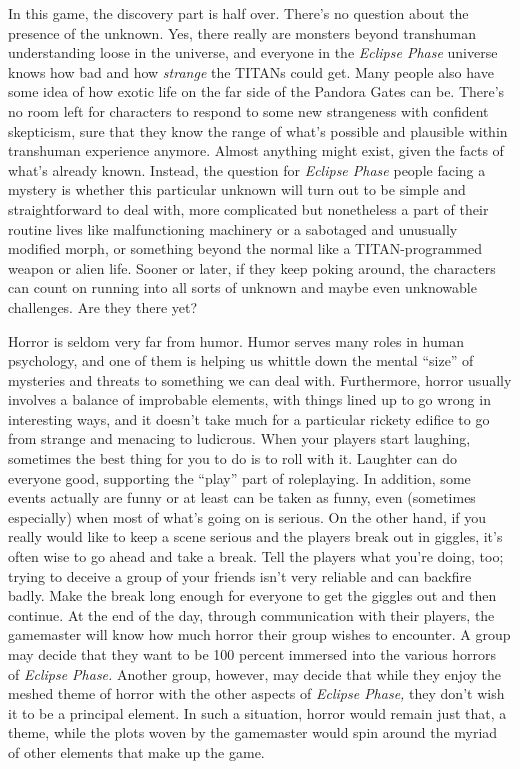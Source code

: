 In this game, the discovery part is half over. There's 
no question about the presence of the unknown. 
Yes, there really are monsters beyond transhuman 
understanding loose in the universe, and everyone in 
the \textit{Eclipse Phase} universe knows how bad and how 
\textit{strange }the TITANs could get. Many people also have 
some idea of how exotic life on the far side of the Pandora
Gates can be. There's no room left for characters
to respond to some new strangeness with confident 
skepticism, sure that they know the range of what's 
possible and plausible within transhuman experience 
anymore. Almost anything might exist, given the 
facts of what's already known. Instead, the question 
for \textit{Eclipse Phase }people facing a mystery is whether 
this particular unknown will turn out to be simple 
and straightforward to deal with, more complicated 
but nonetheless a part of their routine lives like malfunctioning
machinery or a sabotaged and unusually
modified morph, or something beyond the normal like 
a TITAN-programmed weapon or alien life. Sooner or 
later, if they keep poking around, the characters can 
count on running into all sorts of unknown and maybe 
even unknowable challenges. Are they there yet?

Horror is seldom very far from humor. Humor 
serves many roles in human psychology, and one of 
them is helping us whittle down the mental ``size'' of 
mysteries and threats to something we can deal with. 
Furthermore, horror usually involves a balance of improbable
elements, with things lined up to go wrong
in interesting ways, and it doesn't take much for a 
particular rickety edifice to go from strange and menacing
to ludicrous. When your players start laughing,
sometimes the best thing for you to do is to roll with 
it. Laughter can do everyone good, supporting the 
``play'' part of roleplaying. In addition, some events 
actually are funny or at least can be taken as funny, 
even (sometimes especially) when most of what's going 
on is serious. On the other hand, if you really would 
like to keep a scene serious and the players break out 
in giggles, it's often wise to go ahead and take a break. 
Tell the players what you're doing, too; trying to deceive
a group of your friends isn't very reliable and
can backfire badly. Make the break long enough for 
everyone to get the giggles out and then continue.
At the end of the day, through communication with 
their players, the gamemaster will know how much 
horror their group wishes to encounter. A group may 
decide that they want to be 100 percent immersed 
into the various horrors of \textit{Eclipse Phase.} Another 
group, however, may decide that while they enjoy 
the meshed theme of horror with the other aspects 
of \textit{Eclipse Phase,} they don't wish it to be a principal 
element. In such a situation, horror would remain just 
that, a theme, while the plots woven by the gamemaster
would spin around the myriad of other elements
that make up the game.

